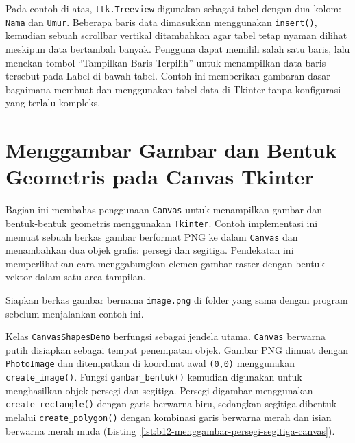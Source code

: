 Pada contoh di atas, \texttt{ttk.Treeview} digunakan sebagai tabel dengan dua kolom: \texttt{Nama} dan \texttt{Umur}. Beberapa baris data dimasukkan menggunakan \texttt{insert()}, kemudian sebuah scrollbar vertikal ditambahkan agar tabel tetap nyaman dilihat meskipun data bertambah banyak. Pengguna dapat memilih salah satu baris, lalu menekan tombol “Tampilkan Baris Terpilih” untuk menampilkan data baris tersebut pada Label di bawah tabel. Contoh ini memberikan gambaran dasar bagaimana membuat dan menggunakan tabel data di Tkinter tanpa konfigurasi yang terlalu kompleks.

\section{Menggambar Gambar dan Bentuk Geometris pada Canvas Tkinter}

Bagian ini membahas penggunaan \texttt{Canvas} untuk menampilkan gambar dan bentuk-bentuk geometris menggunakan \texttt{Tkinter}. Contoh implementasi ini memuat sebuah berkas gambar berformat PNG ke dalam \texttt{Canvas} dan menambahkan dua objek grafis: persegi dan segitiga. Pendekatan ini memperlihatkan cara menggabungkan elemen gambar raster dengan bentuk vektor dalam satu area tampilan.

Siapkan berkas gambar bernama \texttt{image.png} di folder yang sama dengan program sebelum menjalankan contoh ini.

Kelas \texttt{CanvasShapesDemo} berfungsi sebagai jendela utama. \texttt{Canvas} berwarna putih disiapkan sebagai tempat penempatan objek. Gambar PNG dimuat dengan \texttt{PhotoImage} dan ditempatkan di koordinat awal \texttt{(0,0)} menggunakan \texttt{create\_image()}. Fungsi \texttt{gambar\_bentuk()} kemudian digunakan untuk menghasilkan objek persegi dan segitiga. Persegi digambar menggunakan \texttt{create\_rectangle()} dengan garis berwarna biru, sedangkan segitiga dibentuk melalui \texttt{create\_polygon()} dengan kombinasi garis berwarna merah dan isian berwarna merah muda (Listing~\ref{lst:b12-menggambar-persegi-segitiga-canvas}).

